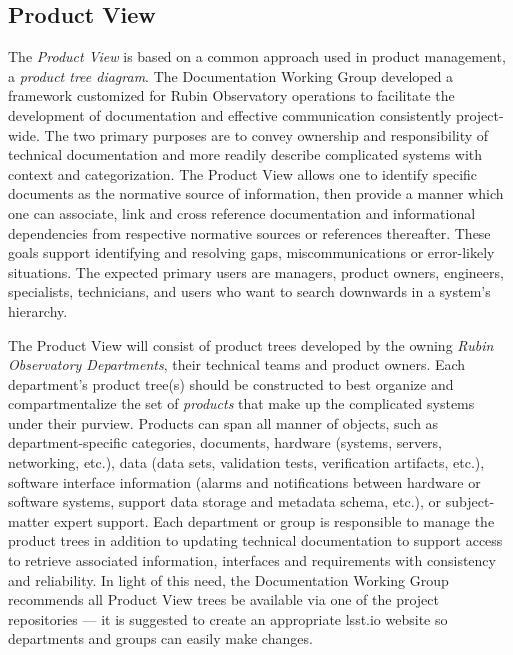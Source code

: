 \subsection{Product View}

The \emph{Product View} is based on a common approach used in product management, a \emph{product tree diagram}.
The Documentation Working Group developed a framework customized for Rubin Observatory operations to facilitate the development of documentation and effective communication consistently project-wide.
The two primary purposes are to convey ownership and responsibility of technical documentation and more readily describe complicated systems with context and categorization.
The Product View allows one to identify specific documents as the normative source of information, then provide a manner which one can associate, link and cross reference documentation and informational dependencies from respective normative sources or references thereafter.
These goals support identifying and resolving gaps, miscommunications or error-likely situations.
The expected primary users are managers, product owners, engineers, specialists, technicians, and users who want to search downwards in a system's hierarchy.

The Product View will consist of product trees developed by the owning \emph{Rubin Observatory Departments}, their technical teams and product owners.
Each department's product tree(s) should be constructed to best organize and compartmentalize the set of \emph{products} that make up the complicated systems under their purview.
Products can span all manner of objects, such as department-specific categories, documents, hardware (systems, servers, networking, etc.), data (data sets, validation tests, verification artifacts, etc.), software interface information (alarms and notifications between hardware or software systems, support data storage and metadata schema, etc.), or subject-matter expert support.
Each department or group is responsible to manage the product trees in addition to updating technical documentation to support access to retrieve associated information, interfaces and requirements with consistency and reliability.
In light of this need, the Documentation Working Group recommends all Product View trees be available via one of the project repositories --- it is suggested to create an appropriate lsst.io website so departments and groups can easily make changes.

